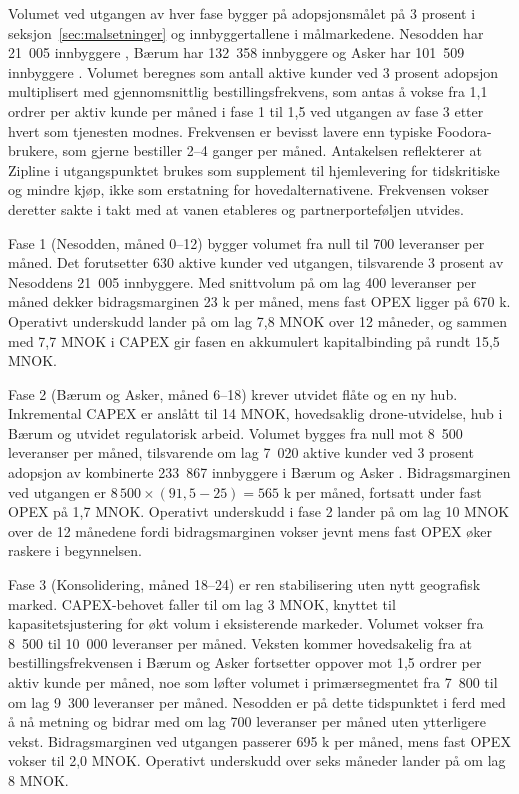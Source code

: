 Volumet ved utgangen av hver fase bygger på adopsjonsmålet på 3 prosent
i seksjon~\ref{sec:malsetninger} og innbyggertallene i målmarkedene. Nesodden
har 21~005 innbyggere \parencite{ssb2026_befolkning}, Bærum har 132~358
innbyggere \parencite{ssb_kommunefakta_baerum} og Asker har 101~509
innbyggere \parencite{ssb_kommunefakta_asker}. Volumet beregnes som
antall aktive kunder ved 3 prosent adopsjon multiplisert med
gjennomsnittlig bestillings\-frekvens, som antas å vokse fra 1{,}1
ordrer per aktiv kunde per måned i fase 1 til 1{,}5 ved utgangen av
fase 3 etter hvert som tjenesten modnes. Frekvensen er bevisst lavere
enn typiske Foodora-brukere, som gjerne bestiller 2--4 ganger per
måned. Antakelsen reflekterer at Zipline i utgangspunktet brukes som
supplement til hjemlevering for tidskritiske og mindre kjøp, ikke som
erstatning for hovedalternativene. Frekvensen vokser deretter sakte i
takt med at vanen etableres og partnerporteføljen utvides.

Fase 1 (Nesodden, måned 0--12) bygger volumet fra null til 700
leveranser per måned. Det forutsetter 630 aktive kunder ved utgangen,
tilsvarende 3 prosent av Nesoddens 21~005 innbyggere. Med snittvolum på
om lag 400 leveranser per måned dekker bidrags\-marginen 23 k per
måned, mens fast OPEX ligger på 670 k. Operativt underskudd lander på
om lag 7{,}8 MNOK over 12 måneder, og sammen med 7{,}7 MNOK i CAPEX gir
fasen en akkumulert kapitalbinding på rundt 15{,}5 MNOK.

Fase 2 (Bærum og Asker, måned 6--18) krever utvidet flåte og en ny hub.
Inkremental CAPEX er anslått til 14 MNOK, hovedsaklig drone-utvidelse,
hub i Bærum og utvidet regulatorisk arbeid. Volumet bygges fra null mot
8~500 leveranser per måned, tilsvarende om lag 7~020 aktive kunder ved
3 prosent adopsjon av kombinerte 233~867 innbyggere i Bærum og Asker
\parencite{ssb_kommunefakta_baerum, ssb_kommunefakta_asker}.
Bidragsmarginen ved utgangen er $8\,500 \times (91{,}5 - 25) = 565$ k
per måned, fortsatt under fast OPEX på 1{,}7 MNOK. Operativt underskudd
i fase 2 lander på om lag 10 MNOK over de 12 månedene fordi
bidragsmarginen vokser jevnt mens fast OPEX øker raskere i begynnelsen.

Fase 3 (Konsolidering, måned 18--24) er ren stabilisering uten nytt
geografisk marked. CAPEX-behovet faller til om lag 3 MNOK, knyttet til
kapasitets\-justering for økt volum i eksisterende markeder. Volumet
vokser fra 8~500 til 10~000 leveranser per måned. Veksten kommer
hovedsakelig fra at bestillingsfrekvensen i Bærum og Asker fortsetter
oppover mot 1{,}5 ordrer per aktiv kunde per måned, noe som løfter
volumet i primærsegmentet fra 7~800 til om lag 9~300 leveranser per
måned. Nesodden er på dette tidspunktet i ferd med å nå metning og
bidrar med om lag 700 leveranser per måned uten ytterligere vekst.
Bidragsmarginen ved utgangen passerer 695 k per måned, mens fast OPEX
vokser til 2{,}0 MNOK. Operativt underskudd over seks måneder lander på
om lag 8 MNOK.

